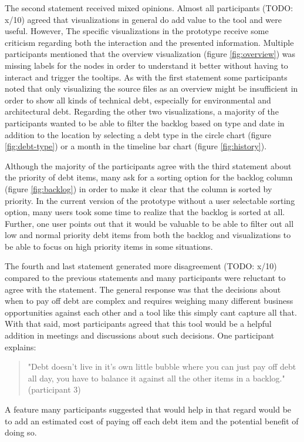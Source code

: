 The second statement received mixed opinions.
Almost all participants (TODO: x/10) agreed that visualizations in general do add value to the tool and were useful.
However, The specific visualizations in the prototype receive some criticism regarding both the interaction and the presented information. 
Multiple participants mentioned that the overview visualization (figure \ref{fig:overview}) was missing labels for the nodes in order to understand it better without having to interact and trigger the tooltips.
As with the first statement some participants noted that only visualizing the source files as an overview might be insufficient in order to show all kinds of technical debt, especially for environmental and architectural debt.
Regarding the other two visualizations, a majority of the participants wanted to be able to filter the backlog based on type and date in addition to the location by selecting a debt type in the circle chart (figure \ref{fig:debt-type}) or a month in the timeline bar chart (figure \ref{fig:history}).

Although the majority of the participants agree with the third statement about the priority of debt items, many ask for a sorting option for the backlog column (figure \ref{fig:backlog}) in order to make it clear that the column is sorted by priority.
In the current version of the prototype without a user selectable sorting option, many users took some time to realize that the backlog is sorted at all.
Further, one user points out that it would be valuable to be able to filter out all low and normal priority debt items from both the backlog and visualizations to be able to focus on high priority items in some situations.

The fourth and last statement generated more disagreement (TODO: x/10) compared to the previous statements and many participants were reluctant to agree with the statement.
The general response was that the decisions about when to pay off debt are complex and requires weighing many different business opportunities against each other and a tool like this simply cant capture all that.
With that said, most participants agreed that this tool would be a helpful addition in meetings and discussions about such decisions.
One participant explains:
\begin{quote}
  "Debt doesn't live in it's own little bubble where you can just pay off debt all day, you have to balance it against all the other items in a backlog." (participant 3)
\end{quote}
A feature many participants suggested that would help in that regard would be to add an estimated cost of paying off each debt item and the potential benefit of doing so.

